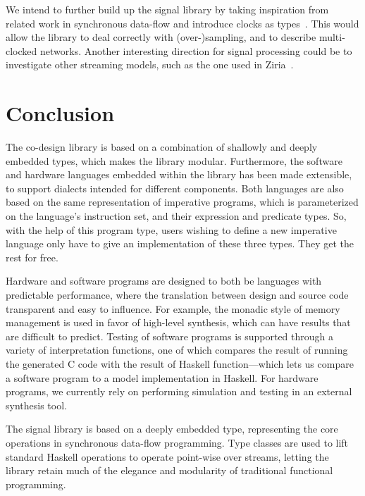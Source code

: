 \documentclass[../paper.tex]{subfiles}
\begin{document}
We intend to further build up the signal library by taking inspiration from related work in synchronous data-flow and introduce clocks as types~\cite{lucy2008}. This would allow the library to deal correctly with (over-)sampling, and to describe multi-clocked networks. Another interesting direction for signal processing could be to investigate other streaming models, such as the one used in Ziria~\cite{ziria2015, fudgets1993}.

\section{Conclusion}
\label{conc}

The co-design library is based on a combination of shallowly and deeply embedded types, which makes the library modular. Furthermore, the software and hardware languages embedded within the library has been made extensible, to support dialects intended for different components. Both languages are also based on the same representation of imperative programs, which is parameterized on the language's instruction set, and their expression and predicate types. So, with the help of this program type, users wishing to define a new imperative language only have to give an implementation of these three types. They get the rest for free.

Hardware and software programs are designed to both be languages with predictable performance, where the translation between design and source code transparent and easy to influence. For example, the monadic style of memory management is used in favor of high-level synthesis, which can have results that are difficult to predict. Testing of software programs is supported through a variety of interpretation functions, one of which compares the result of running the generated C code with the result of Haskell function---which lets us compare a software program to a model implementation in Haskell. For hardware programs, we currently rely on performing simulation and testing in an external synthesis tool.

The signal library is based on a deeply embedded type, representing the core operations in synchronous data-flow programming. Type classes are used to lift standard Haskell operations to operate point-wise over streams, letting the library retain much of the elegance and modularity of traditional functional programming.
\end{document}
